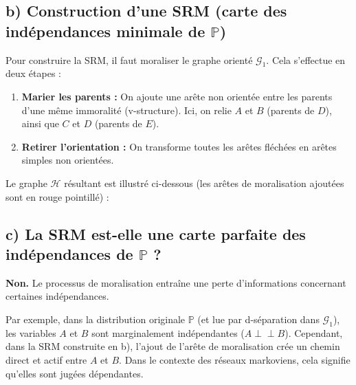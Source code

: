 \documentclass{article}
\newcommand{\indep}{\perp \!\!\! \perp}
\begin{document}
\subsection*{b) Construction d'une SRM (carte des indépendances minimale de $\mathbb{P}$)}

Pour construire la SRM, il faut moraliser le graphe orienté $\mathcal{G}_1$. Cela s'effectue en deux étapes :
\begin{enumerate}
    \item \textbf{Marier les parents :} On ajoute une arête non orientée entre les parents d'une même immoralité (v-structure). Ici, on relie $A$ et $B$ (parents de $D$), ainsi que $C$ et $D$ (parents de $E$).
    \item \textbf{Retirer l'orientation :} On transforme toutes les arêtes fléchées en arêtes simples non orientées.
\end{enumerate}

Le graphe $\mathcal{H}$ résultant est illustré ci-dessous (les arêtes de moralisation ajoutées sont en rouge pointillé) :

\begin{center}
\end{center}

\subsection*{c) La SRM est-elle une carte parfaite des indépendances de $\mathbb{P}$ ?}

\textbf{Non.} Le processus de moralisation entraîne une perte d'informations concernant certaines indépendances. 

Par exemple, dans la distribution originale $\mathbb{P}$ (et lue par d-séparation dans $\mathcal{G}_1$), les variables $A$ et $B$ sont marginalement indépendantes ($A \indep B$). Cependant, dans la SRM construite en b), l'ajout de l'arête de moralisation crée un chemin direct et actif entre $A$ et $B$. Dans le contexte des réseaux markoviens, cela signifie qu'elles sont jugées dépendantes. 
\end{document}
